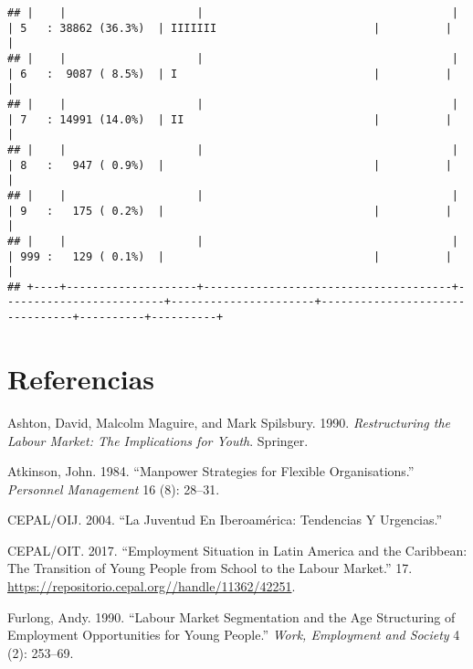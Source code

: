 \documentclass[]{article}
\begin{document}
\begin{verbatim}
## |    |                    |                                      |                         | 5   : 38862 (36.3%)  | IIIIIII                        |          |          |
## |    |                    |                                      |                         | 6   :  9087 ( 8.5%)  | I                              |          |          |
## |    |                    |                                      |                         | 7   : 14991 (14.0%)  | II                             |          |          |
## |    |                    |                                      |                         | 8   :   947 ( 0.9%)  |                                |          |          |
## |    |                    |                                      |                         | 9   :   175 ( 0.2%)  |                                |          |          |
## |    |                    |                                      |                         | 999 :   129 ( 0.1%)  |                                |          |          |
## +----+--------------------+--------------------------------------+-------------------------+----------------------+--------------------------------+----------+----------+
\end{verbatim}

\hypertarget{referencias}{%
\section*{Referencias}\label{referencias}}

\hypertarget{refs}{}
\leavevmode\hypertarget{ref-ashton_restructuring_1990}{}%
Ashton, David, Malcolm Maguire, and Mark Spilsbury. 1990.
\emph{Restructuring the Labour Market: The Implications for Youth}.
Springer.

\leavevmode\hypertarget{ref-atkinson_manpower_1984}{}%
Atkinson, John. 1984. ``Manpower Strategies for Flexible
Organisations.'' \emph{Personnel Management} 16 (8): 28--31.

\leavevmode\hypertarget{ref-cepaloij_juventud_2004}{}%
CEPAL/OIJ. 2004. ``La Juventud En Iberoamérica: Tendencias Y
Urgencias.''

\leavevmode\hypertarget{ref-cepaloit_employment_2017}{}%
CEPAL/OIT. 2017. ``Employment Situation in Latin America and the
Caribbean: The Transition of Young People from School to the Labour
Market.'' 17. \url{https://repositorio.cepal.org//handle/11362/42251}.

\leavevmode\hypertarget{ref-furlong_labour_1990}{}%
Furlong, Andy. 1990. ``Labour Market Segmentation and the Age
Structuring of Employment Opportunities for Young People.'' \emph{Work,
Employment and Society} 4 (2): 253--69.
\end{document}
